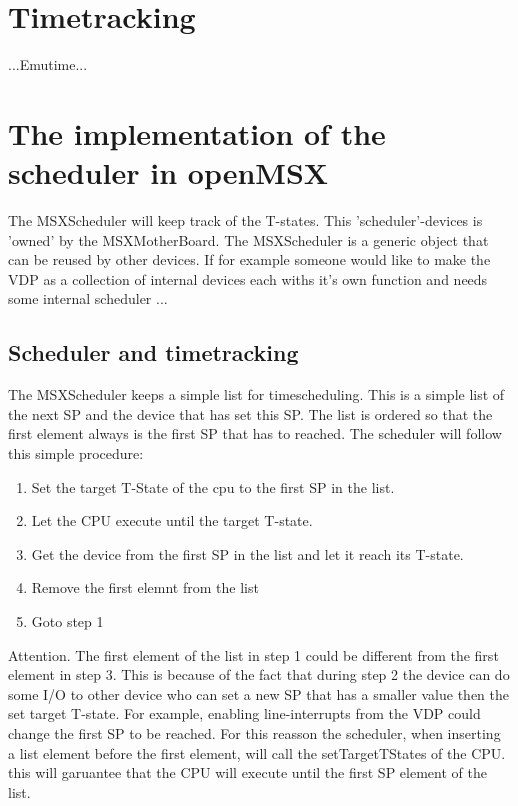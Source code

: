 \documentclass[11pt, a4paper]{report}
\begin{document}
\section{Timetracking}

...Emutime...


\section{The implementation of the scheduler in openMSX}

The MSXScheduler will keep track of the T-states. This 'scheduler'-devices
is 'owned' by the MSXMotherBoard. The MSXScheduler is a generic object
that can be reused by other devices. If for example someone would like to
make the VDP as a collection of internal devices each withs it's own
function and needs some internal scheduler ...

\subsection{Scheduler and timetracking}

The MSXScheduler keeps a simple list for timescheduling. This is a simple
list of the next SP and the device that has set this SP. The list is
ordered so that the first element always is the first SP that has to
reached.  The scheduler will follow this simple procedure:
\begin{enumerate}
\item Set the target T-State of the cpu to the first SP in the list.
\item Let the CPU execute until the target T-state.
\item Get the device from the first SP in the list and let it reach its
T-state.
\item Remove the first elemnt from the list
\item Goto step 1
\end{enumerate}

Attention. The first element of the list in step 1 could be different from
the first element in step 3. This is because of the fact that during step
2 the device can do some I/O to other device who can set a new SP that has
a smaller value then the set target T-state. For example, enabling
line-interrupts from the VDP could change the first SP to be reached.  For
this reasson the scheduler, when inserting a list element before the first
element, will call the setTargetTStates of the CPU. this will garuantee
that the CPU will execute until the first SP element of the list.
\end{document}
